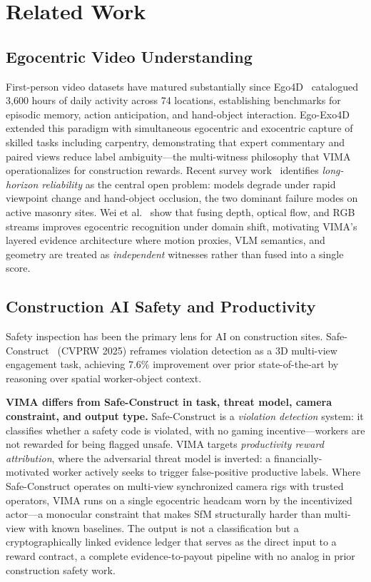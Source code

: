 \documentclass[sigconf,nonacm]{acmart}
\begin{document}
\section{Related Work}
\label{sec:related}

\subsection{Egocentric Video Understanding}

First-person video datasets have matured substantially since Ego4D~\cite{ego4d} catalogued 3,600 hours of daily activity across 74 locations, establishing benchmarks for episodic memory, action anticipation, and hand-object interaction.
Ego-Exo4D~\cite{grauman2024egoexo4d} extended this paradigm with simultaneous egocentric and exocentric capture of skilled tasks including carpentry, demonstrating that expert commentary and paired views reduce label ambiguity---the multi-witness philosophy that VIMA operationalizes for construction rewards.
Recent survey work~\cite{plizzari2024outlook} identifies \emph{long-horizon reliability} as the central open problem: models degrade under rapid viewpoint change and hand-object occlusion, the two dominant failure modes on active masonry sites.
Wei et al.~\cite{wei2024multimodal} show that fusing depth, optical flow, and RGB streams improves egocentric recognition under domain shift, motivating VIMA's layered evidence architecture where motion proxies, VLM semantics, and geometry are treated as \emph{independent} witnesses rather than fused into a single score.

\subsection{Construction AI Safety and Productivity}

Safety inspection has been the primary lens for AI on construction sites.
Safe-Construct~\cite{chharia2025safeconstruct} (CVPRW 2025) reframes violation detection as a 3D multi-view engagement task, achieving 7.6\% improvement over prior state-of-the-art by reasoning over spatial worker-object context.

\textbf{VIMA differs from Safe-Construct in task, threat model, camera constraint, and output type.}
Safe-Construct is a \emph{violation detection} system: it classifies whether a safety code is violated, with no gaming incentive---workers are not rewarded for being flagged unsafe.
VIMA targets \emph{productivity reward attribution}, where the adversarial threat model is inverted: a financially-motivated worker actively seeks to trigger false-positive productive labels.
Where Safe-Construct operates on multi-view synchronized camera rigs with trusted operators, VIMA runs on a single egocentric headcam worn by the incentivized actor---a monocular constraint that makes SfM structurally harder than multi-view with known baselines.
The output is not a classification but a cryptographically linked evidence ledger that serves as the direct input to a reward contract, a complete evidence-to-payout pipeline with no analog in prior construction safety work.
\end{document}
